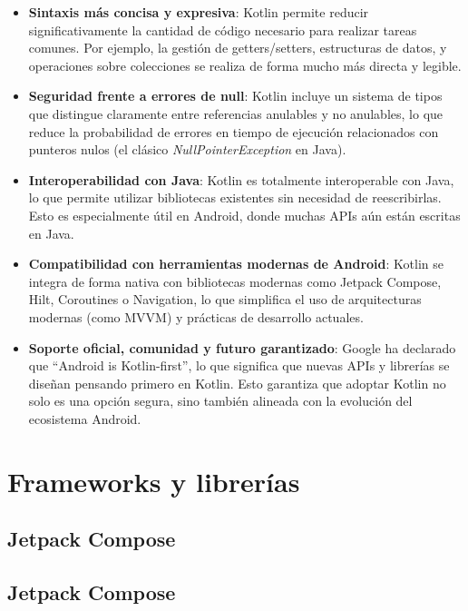 \begin{itemize}
    \item \textbf{Sintaxis más concisa y expresiva}: Kotlin permite reducir significativamente la cantidad de código necesario para realizar tareas comunes. Por ejemplo, la gestión de getters/setters, estructuras de datos, y operaciones sobre colecciones se realiza de forma mucho más directa y legible.

    \item \textbf{Seguridad frente a errores de null}: Kotlin incluye un sistema de tipos que distingue claramente entre referencias anulables y no anulables, lo que reduce la probabilidad de errores en tiempo de ejecución relacionados con punteros nulos (el clásico \textit{NullPointerException} en Java).

    \item \textbf{Interoperabilidad con Java}: Kotlin es totalmente interoperable con Java, lo que permite utilizar bibliotecas existentes sin necesidad de reescribirlas. Esto es especialmente útil en Android, donde muchas APIs aún están escritas en Java.

    \item \textbf{Compatibilidad con herramientas modernas de Android}: Kotlin se integra de forma nativa con bibliotecas modernas como Jetpack Compose, Hilt, Coroutines o Navigation, lo que simplifica el uso de arquitecturas modernas (como MVVM) y prácticas de desarrollo actuales.

    \item \textbf{Soporte oficial, comunidad y futuro garantizado}: Google ha declarado que “Android is Kotlin-first”, lo que significa que nuevas APIs y librerías se diseñan pensando primero en Kotlin. Esto garantiza que adoptar Kotlin no solo es una opción segura, sino también alineada con la evolución del ecosistema Android.
\end{itemize}

\section{Frameworks y librerías}

\subsection{Jetpack Compose}

\subsection{Jetpack Compose}

